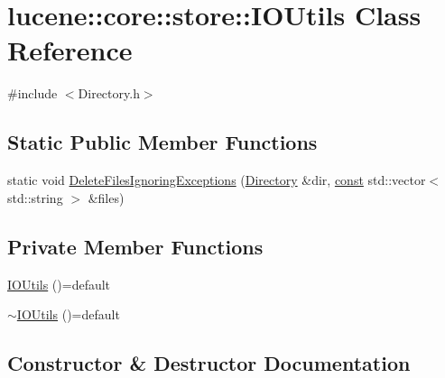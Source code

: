 \hypertarget{classlucene_1_1core_1_1store_1_1IOUtils}{}\section{lucene\+:\+:core\+:\+:store\+:\+:I\+O\+Utils Class Reference}
\label{classlucene_1_1core_1_1store_1_1IOUtils}


{\ttfamily \#include $<$Directory.\+h$>$}

\subsection*{Static Public Member Functions}
\begin{DoxyCompactItemize}
\item 
static void \mbox{\hyperlink{classlucene_1_1core_1_1store_1_1IOUtils_a55750fb0eb499609ec39c7a25602abb8}{Delete\+Files\+Ignoring\+Exceptions}} (\mbox{\hyperlink{classlucene_1_1core_1_1store_1_1Directory}{Directory}} \&dir, \mbox{\hyperlink{ZlibCrc32_8h_a2c212835823e3c54a8ab6d95c652660e}{const}} std\+::vector$<$ std\+::string $>$ \&files)
\end{DoxyCompactItemize}
\subsection*{Private Member Functions}
\begin{DoxyCompactItemize}
\item 
\mbox{\hyperlink{classlucene_1_1core_1_1store_1_1IOUtils_a3f3c7c25167c5d57724efc0872972877}{I\+O\+Utils}} ()=default
\item 
\mbox{\hyperlink{classlucene_1_1core_1_1store_1_1IOUtils_ae7aa671e9cfe4dc094791e5bd5dda818}{$\sim$\+I\+O\+Utils}} ()=default
\end{DoxyCompactItemize}


\subsection{Constructor \& Destructor Documentation}
\mbox{\label{classlucene_1_1core_1_1store_1_1IOUtils_a3f3c7c25167c5d57724efc0872972877}} 
